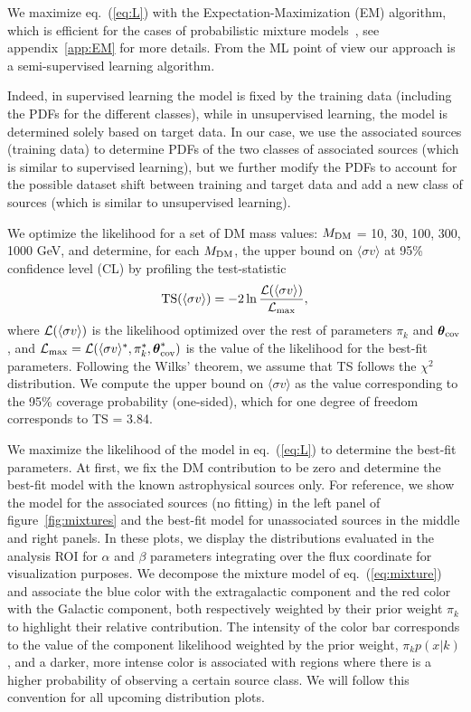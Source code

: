 \documentclass[12pt, a4paper]{article}
\newcommand{\be}{\begin{equation}}
\newcommand{\ee}{\end{equation}}
\newcommand{\btheta}{\boldsymbol{\theta}}
\newcommand{\sigmav}{\langle \sigma v \rangle}
\newcommand{\mdm}{{M_{\rm DM}}}
\begin{document}
We maximize eq.~(\ref{eq:L}) with the Expectation-Maximization (EM) algorithm, which is efficient for the cases of probabilistic mixture models~\cite{10.1162/089976602753284446_Saerens}, see appendix~\ref{app:EM} for more details.
From the ML point of view our approach is a semi-supervised learning algorithm.

Indeed, in supervised learning the model is fixed by the training data (including the PDFs for the different classes), while in unsupervised learning, the model is determined solely based on target data.
In our case, we use the associated sources (training data) to determine PDFs of the two classes of associated sources (which is similar to supervised learning), but we further modify the PDFs to account for the possible dataset shift between training and target data and add a new class of sources (which is similar to unsupervised learning).


We optimize the likelihood for a set of DM mass values: $\mdm$ = 10, 30, 100, 300, 1000 GeV, and determine, for each $\mdm$, the upper bound on $\sigmav$ at 95\% confidence level (CL) by profiling the test-statistic 
\be
{\rm TS}(\sigmav) = -2\ln \frac{{\cal L}(\sigmav)}
{{\cal L}_{\rm max}}, 
\label{eq:TS}
\ee
where ${\cal L}(\sigmav)$ is the likelihood optimized over the rest of parameters $\pi_k$ and $\btheta_{\rm cov}$, and ${\cal L}_{\rm max}={\cal L}(\sigmav^*,\pi_k^*,\btheta_{\rm cov}^*)$ is the value of the likelihood for the best-fit parameters. 
Following the Wilks' theorem, we assume that TS follows the $\chi^2$ distribution. 
We compute the upper bound on $\sigmav$ as the value corresponding to the 95\% coverage probability (one-sided), which for one degree of freedom corresponds to
TS = 3.84.

We maximize the likelihood of the model in eq.~(\ref{eq:L}) to determine the best-fit parameters.
At first, we fix the DM contribution to be zero and determine the best-fit model with the known astrophysical sources only.
For reference, we show the model for the associated sources (no fitting) in the left panel of figure~\ref{fig:mixtures} and the best-fit model for unassociated sources in the middle and right panels.
In these plots, we display the distributions evaluated in the analysis ROI for $\alpha$ and $\beta$ parameters integrating over the flux coordinate for visualization purposes. We decompose the mixture model of eq.~(\ref{eq:mixture}) and associate the blue color with the extragalactic component and the red color with the Galactic component, both respectively weighted by their prior weight $\pi_k$ to highlight their relative contribution. The intensity of the color bar corresponds to the value of the component likelihood weighted by the prior weight, $\pi_k p(x | k)$, and a darker, more intense color is associated with regions where there is a higher probability of observing a certain source class. We will follow this convention for all upcoming distribution plots.
\end{document}
